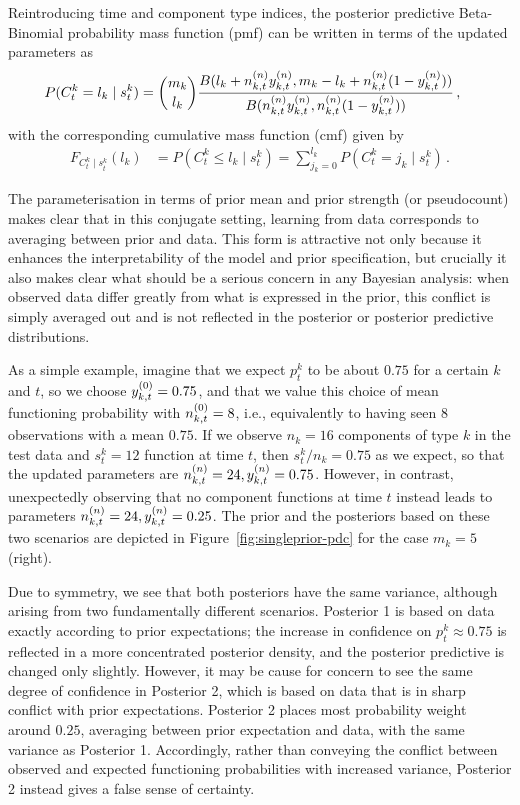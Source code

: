 \documentclass[12pt, a4paper]{elsarticle}
\newcommand{\ptk}{p^k_t}
\begin{document}
Reintroducing time and component type indices, the posterior predictive Beta-Binomial probability mass function (pmf) can be written in terms of the updated parameters as
\begin{align}
P(C^k_t = l_k \mid s^k_t) &= {m_k \choose l_k} \frac{B(l_k + n^{(n)}_{k,t}y^{(n)}_{k,t}, m_k - l_k + n^{(n)}_{k,t}(1-y^{(n)}_{k,t}))}
                                                    {B(n^{(n)}_{k,t}y^{(n)}_{k,t}, n^{(n)}_{k,t}(1-y^{(n)}_{k,t}))} \,,
\label{eq:postpredCny}
\end{align}
with the corresponding cumulative mass function (cmf) given by
\begin{align}
F_{C^k_t\mid s^k_t}(l_k) &= P(C^k_t \le l_k \mid s^k_t) = \sum_{j_k=0}^{l_k} P(C^k_t = j_k \mid s^k_t)\,.
\label{eq:postpredCnycmf}
\end{align}


The parameterisation in terms of prior mean and prior strength (or pseudocount)
makes clear that in this conjugate setting,
learning from data corresponds to averaging between prior and data.
This form is attractive not only because it enhances the interpretability of the model and prior specification,
but crucially it also makes clear what should be a serious concern in any Bayesian analysis:
when observed data differ greatly from what is expressed in the prior,
this conflict is simply averaged out
and is not reflected in the posterior or posterior predictive distributions.

As a simple example, imagine that we expect $\ptk$ to be about $0.75$ for a certain $k$ and $t$,
so we choose $y^{(0)}_{k,t} = 0.75$,
and that we value this choice of mean functioning probability with $n^{(0)}_{k,t} = 8$,
i.e., equivalently to having seen $8$ observations with a mean $0.75$.
If we observe $n_k = 16$ components of type $k$ in the test data and $s^k_t = 12$ function at time $t$,
then $s^k_t/n_k = 0.75$ as we expect,
so that the updated parameters are $n^{(n)}_{k,t} = 24, y^{(n)}_{k,t}=0.75$.
However, in contrast, unexpectedly observing that no component functions at time $t$ instead
leads to parameters $n^{(n)}_{k,t} = 24, y^{(n)}_{k,t}=0.25$.
The prior and the posteriors based on these two scenarios
are depicted in Figure~\ref{fig:singleprior-pdc}
for the case $m_k = 5$ (right).

Due to symmetry, we see that both posteriors have the same variance,
although arising from two fundamentally different scenarios.
Posterior 1 is based on data exactly according to prior expectations;
the increase in confidence on $\ptk \approx 0.75$
is reflected in a more concentrated posterior density,
and the posterior predictive is changed only slightly.
However, it may be cause for concern to see the same degree of confidence in Posterior 2,
which is based on data that is in sharp conflict with prior expectations.
Posterior 2 places most probability weight around $0.25$,
averaging between prior expectation and data,
with the same variance as Posterior 1.
Accordingly, rather than conveying the conflict between observed
and expected functioning probabilities with increased variance,
Posterior 2 instead gives a false sense of certainty.
\end{document}
